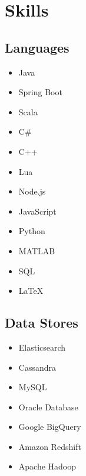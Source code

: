 \documentclass[letterpaper]{resume}
\begin{document}



\begin{minipage}[t]{0.22\columnwidth}


\section{Skills}

\subsection{Languages}
\vspace{2pt}
\begin{itemize}
\item Java
\item Spring Boot
\item Scala
\item C\#
\item C++
\item Lua
\item Node.js
\item JavaScript
\item Python
\item MATLAB
\item SQL
\item \LaTeX
\end{itemize}

\sectionspace

\subsection{Data Stores}
\vspace{2pt}
\begin{itemize}
\item Elasticsearch
\item Cassandra
\item MySQL
\item Oracle Database
\item Google BigQuery
\item Amazon Redshift
\item Apache Hadoop
\end{itemize}


\end{minipage}
\end{document}
